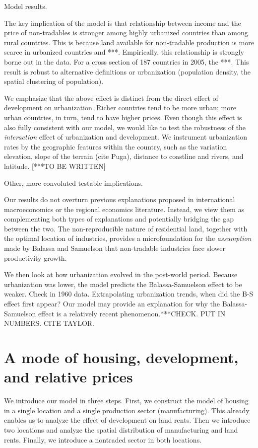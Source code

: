 \documentclass[12pt]{article}
\begin{document}
Model results.

The key implication of the model is that relationship between income and the price of non-tradables is stronger among highly urbanized countries than among rural countries. This is because land available for non-tradable production is more scarce in urbanized countries and ***. Empirically, this relationship is strongly borne out in the data. For a cross section of 187 countries in 2005, the ***. This result is robust to alternative definitions or urbanization (population density, the spatial clustering of population).

We emphasize that the above effect is distinct from the direct effect of development on urbanization. Richer countries tend to be more urban; more urban countries, in turn, tend to have higher prices. Even though this effect is also fully consistent with our model, we would like to test the robustness of the \emph{interaction} effect of urbanization and development. We instrument urbanization rates by the geographic features within the country, such as the variation elevation, slope of the terrain (cite Puga), distance to coastline and rivers, and latitude. [***TO BE WRITTEN]

Other, more convoluted testable implications.

Our results do not overturn previous explanations proposed in international macroeconomics or the regional economics literature. Instead, we view them as complementing both types of explanations and potentially bridging the gap between the two. The non-reproducible nature of residential land, together with the optimal location of industries, provides a microfoundation for the \emph{assumption} made by Balassa and Samuelson that non-tradable industries face slower productivity growth.

We then look at how urbanization evolved in the post-world period. Because urbanization was lower, the model predicts the Balassa-Samuelson effect to be weaker. Check in 1960 data. Extrapolating urbanization trends, when did the B-S effect first appear? Our model may provide an explanation for why the Balassa-Samuelson effect is a relatively recent phenomenon.***CHECK. PUT IN NUMBERS. CITE TAYLOR.


\section{A mode of housing, development, and relative prices}
We introduce our model in three steps. First, we construct the model of housing in a single location and a single production sector (manufacturing). This already enables us to analyze the effect of development on land rents. Then we introduce two locations and analyze the spatial distribution of manufacturing and land rents. Finally, we introduce a nontraded sector in both locations.
\end{document}
